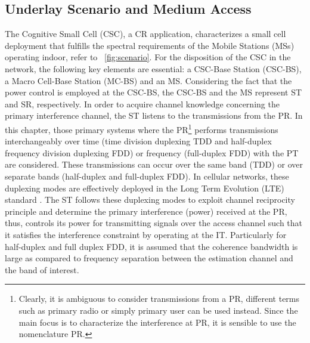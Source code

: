 \subsection{Underlay Scenario and Medium Access}

The Cognitive Small Cell (CSC), a CR application, characterizes a small cell deployment that fulfills the spectral requirements of the Mobile Stations (MSs) operating indoor, refer to \figurename~\ref{fig:scenario}.
For the disposition of the CSC in the network, the following key elements are essential: a CSC-Base Station (CSC-BS), a Macro Cell-Base Station (MC-BS) and an MS. 
Considering the fact that the power control is employed at the CSC-BS, the CSC-BS and the MS represent ST and SR, respectively. In order to acquire channel knowledge concerning the primary interference channel, the ST listens to the transmissions from the PR. In this chapter, those primary systems where the PR\footnote{Clearly, it is ambiguous to consider transmissions from a PR, different terms such as primary radio or simply primary user can be used instead. Since the main focus is to characterize the interference at PR, it is sensible to use the nomenclature PR.} performs transmissions interchangeably over time (time division duplexing TDD and half-duplex frequency division duplexing FDD) or frequency (full-duplex FDD) with the PT are considered. These transmissions can occur over the same band (TDD) or over separate bands (half-duplex and full-duplex FDD). 
In cellular networks, these duplexing modes are effectively deployed in the Long Term Evolution (LTE) standard \cite{LTE09}. The ST follows these duplexing modes to exploit channel reciprocity principle and determine the primary interference (power) received at the PR, thus, controls its power for transmitting signals over the access channel such that it satisfies the interference constraint by operating at the IT. Particularly for half-duplex and full duplex FDD, it is assumed that the coherence bandwidth is large as compared to frequency separation between the estimation channel and the band of interest. 

